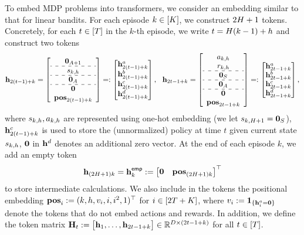 To embed MDP problems into transformers, we consider an embedding similar to that for linear bandits. For each episode $k\in[{K}]$, we construct $2{H}+1$ tokens. Concretely, for each $t\in[{T}]$ in the $k$-th episode, we write  $t={H}(k-1)+h$  and construct two tokens
\[
\begin{aligned}
\bh_{2(t-1)+k}=
\left[
\begin{array}{cc}
     \bzero_{\Numact+1} \\
     \hdashline
     \state_{k,h}\\
      \hdashline
    \bzero_{\Numact}\\
    \hdashline
    \bzero\\
    \posv_{2(t-1)+k}
\end{array}\right]
=:
\begin{bmatrix}
     \bh_{2(t-1)+k}^{\parta} \\  \bh_{2(t-1)+k}^{\partb}\\  \bh_{2(t-1)+k}^{\partc}\\   \bh_{2(t-1)+k}^{\partd}\\
\end{bmatrix},~~
\bh_{2t-1+k}=
\left[
\begin{array}{cc}
     \action_{k,h} \\
      \reward_{k,h}\\
      \hdashline
      \bzero_{\Numst}\\
      \hdashline
      \bzero_{\Numact}\\
     \hdashline
      \bzero\\
      \posv_{2t-1+k}
\end{array}\right]=:
\begin{bmatrix}
    \bh_{2t-1+k}^{\parta} \\  \bh_{2t-1+k}^{\partb}\\   \bh_{2t-1+k}^{\partc}\\   \bh_{2t-1+k}^{\partd}
\end{bmatrix},
\end{aligned}
\]
where  ${s}_{k,h},{a}_{k,h}$ are represented using one-hot embedding (we let ${s}_{k,{H}+1}={\mathbf 0}_{S}$), ${\mathbf h}^{c}_{2(t-1)+k}$ is used to store the (unnormalized)  policy at time  $t$ given current state ${s}_{k,h}$, ${\mathbf 0}$ in ${\mathbf h}^{d}$ denotes an additional zero vector. At the end of each episode $k$, we add an empty token
$$
{\mathbf h}_{(2{H}+1)k}={\mathbf h}^{{\mathsf{emp}}}_{k}:=\begin{bmatrix}
    {\mathbf 0} &{\mathbf{pos}}_{(2{H}+1)k}
\end{bmatrix}^\top
$$ to store intermediate calculations. We also include in the tokens  the positional embedding ${\mathbf{pos}}_i:=(k,h,v_i,i,i^2,1)^\top$ for $i\in[2{T}+{K}]$, where ${v}_i:={\mathbf 1}_{\{{\mathbf h}_i^{a}={\mathbf 0}\}}$  denote the tokens that do not embed actions and rewards.    In addition, we define  the token matrix ${\mathbf H}_t:=\begin{bmatrix}
    {\mathbf h}_1,\ldots,{\mathbf h}_{2t-1+k}
\end{bmatrix}\in\mathbb{R}^{D\times (2t-1+k)}$ for all $t\in[{T}]$.




